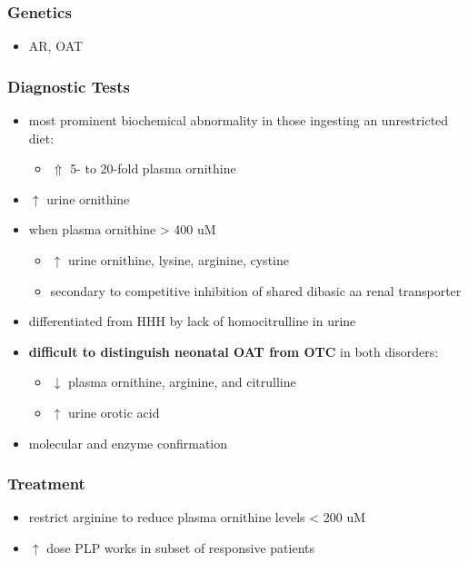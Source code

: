 \documentclass{scrartcl}
\begin{document}
\subsubsection{Genetics}
\label{sec:orged6340a}
\begin{itemize}
\item AR, OAT
\end{itemize}

\subsubsection{Diagnostic Tests}
\label{sec:org6971f9c}
\begin{itemize}
\item most prominent biochemical abnormality in those ingesting an
unrestricted diet:
\begin{itemize}
\item \(\Uparrow\) 5- to 20-fold plasma ornithine
\end{itemize}
\item \(\uparrow\) urine ornithine
\item when plasma ornithine \textgreater{} 400 uM
\begin{itemize}
\item \(\uparrow\) urine ornithine, lysine, arginine, cystine
\item secondary to competitive inhibition of shared dibasic aa renal transporter
\end{itemize}
\item differentiated from HHH by lack of homocitrulline in urine
\item \textbf{difficult to distinguish neonatal OAT from OTC} in both disorders:
\begin{itemize}
\item \(\downarrow\) plasma ornithine, arginine, and citrulline
\item \(\uparrow\) urine orotic acid
\end{itemize}
\item molecular and enzyme confirmation
\end{itemize}

\subsubsection{Treatment}
\label{sec:org14eba24}
\begin{itemize}
\item restrict arginine to reduce plasma ornithine levels \textless{} 200 uM
\item \(\uparrow\) dose PLP works in subset of responsive patients
\end{itemize}
\end{document}
